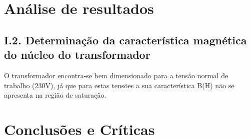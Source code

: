 \documentclass[%
  reprint,
  nofootinbib,
  amsmath,amssymb,
  aps,
  10pt,
]{revtex4-1}
\begin{document}
\section{Análise de resultados}
\label{s:aresul}

\subsection*{I.2. Determinação da característica magnética do núcleo do transformador}
O transformador encontra-se bem dimensionado para a tensão normal de trabalho (230V), já que para estas tensões a sua característica B(H) não se apresenta na região de saturação.


\section{Conclusões e Críticas}
\label{s:conclu}




\nocite{*}
{}
\end{document}
